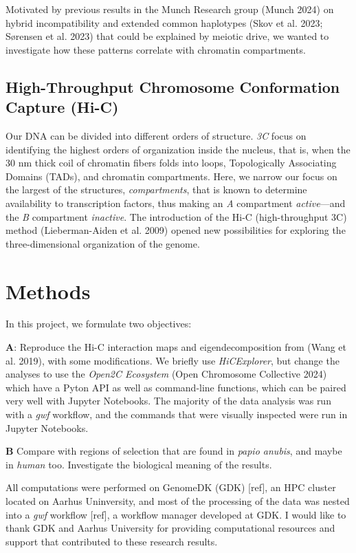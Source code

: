 \documentclass[
  a4paper,
]{scrbook}
\let\oldemph\emph
\renewcommand\emph[1]{\oldemph{\color{gray}#1}}
\begin{document}
Motivated by previous results in the Munch Research group (Munch 2024)
on hybrid incompatibility and extended common haplotypes (Skov et al.
2023; Sørensen et al. 2023) that could be explained by meiotic drive, we
wanted to investigate how these patterns correlate with chromatin
compartments.

\section{High-Throughput Chromosome Conformation Capture
(Hi-C)}\label{high-throughput-chromosome-conformation-capture-hi-c}

Our DNA can be divided into different orders of structure. \emph{3C}
focus on identifying the highest orders of organization inside the
nucleus, that is, when the 30 nm thick coil of chromatin fibers folds
into loops, Topologically Associating Domains (TADs), and chromatin
compartments. Here, we narrow our focus on the largest of the
structures, \emph{compartments}, that is known to determine availability
to transcription factors, thus making an \emph{A} compartment
\emph{active}---and the \emph{B} compartment \emph{inactive}. The
introduction of the Hi-C (high-throughput 3C) method (Lieberman-Aiden et
al. 2009) opened new possibilities for exploring the three-dimensional
organization of the genome.

\newpage{}

\chapter{Methods}\label{methods}

In this project, we formulate two objectives:

\textbf{A}: Reproduce the Hi-C interaction maps and eigendecomposition
from (Wang et al. 2019), with some modifications. We briefly use
\emph{HiCExplorer}, but change the analyses to use the \emph{Open2C
Ecosystem} (Open Chromosome Collective 2024) which have a Pyton API as
well as command-line functions, which can be paired very well with
Jupyter Notebooks. The majority of the data analysis was run with a
\emph{gwf} workflow, and the commands that were visually inspected were
run in Jupyter Notebooks.

\textbf{B} Compare with regions of selection that are found in
\emph{papio anubis}, and maybe in \emph{human} too. Investigate the
biological meaning of the results.

All computations were performed on GenomeDK (GDK) {[}ref{]}, an HPC
cluster located on Aarhus Uninversity, and most of the processing of the
data was nested into a \emph{gwf} workflow {[}ref{]}, a workflow manager
developed at GDK. I would like to thank GDK and Aarhus University for
providing computational resources and support that contributed to these
research results.
\end{document}

